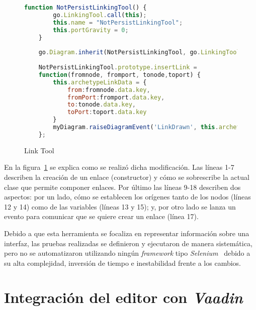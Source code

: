 
\begin{figure}[H]
	\centering
	\begin{lstlisting}[language=Javascript]
	function NotPersistLinkingTool() {
		go.LinkingTool.call(this);
		this.name = "NotPersistLinkingTool";
		this.portGravity = 0;
	}
	
	go.Diagram.inherit(NotPersistLinkingTool, go.LinkingTool);
	
	NotPersistLinkingTool.prototype.insertLink =
	function(fromnode, fromport, tonode,toport) {
		this.archetypeLinkData = {
			from:fromnode.data.key,
			fromPort:fromport.data.key,
			to:tonode.data.key,
			toPort:toport.data.key
		}
		myDiagram.raiseDiagramEvent('LinkDrawn', this.archetypeLinkData);
	};\end{lstlisting}
	\caption{Link Tool}
	\label{fig:linkTool}
\end{figure}


En la figura~\ref{fig:linkTool} se explica como se realizó dicha modificación. Las líneas 1-7 describen la creación de un enlace (constructor) y cómo se sobrescribe la actual clase que permite componer enlaces. Por último las líneas 9-18 describen dos aspectos: por un lado, cómo se establecen los orígenes tanto de los nodos (líneas 12 y 14) como de las variables (líneas 13 y 15); y, por otro lado se lanza un evento para comunicar que se quiere crear un enlace (línea 17).

Debido a que esta herramienta se focaliza en representar información sobre una interfaz, las pruebas realizadas se definieron y ejecutaron de manera sistemática, pero no se automatizaron utilizando ningún \emph{framework} tipo \emph{Selenium}~\cite{} debido a su alta complejidad, inversión de tiempo e inestabilidad frente a los cambios.

\section{Integración del editor con \emph{Vaadin}}

